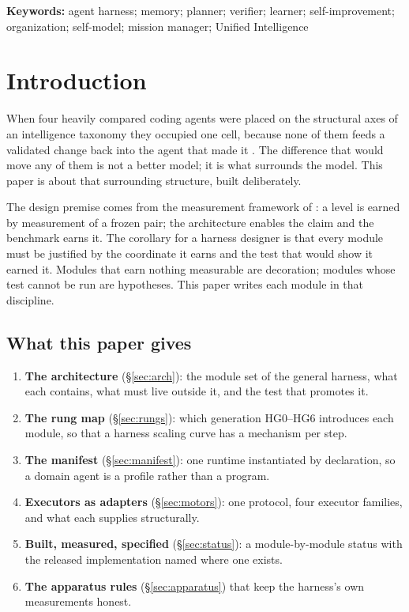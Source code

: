\documentclass[11pt]{article}
\theoremstyle{definition}
\begin{document}
\noindent\textbf{Keywords:} agent harness; memory; planner; verifier; learner; self-improvement; organization; self-model; mission manager; Unified Intelligence

\tableofcontents
\bigskip

\section{Introduction}\label{sec:intro}

When four heavily compared coding agents were placed on the structural axes of an intelligence taxonomy they occupied one cell, because none of them feeds a validated change back into the agent that made it \citep{yang2026capability}. The difference that would move any of them is not a better model; it is what surrounds the model. This paper is about that surrounding structure, built deliberately.

The design premise comes from the measurement framework of \citet{yang2026unified}: a level is earned by measurement of a frozen pair; the architecture enables the claim and the benchmark earns it. The corollary for a harness designer is that every module must be justified by the coordinate it earns and the test that would show it earned it. Modules that earn nothing measurable are decoration; modules whose test cannot be run are hypotheses. This paper writes each module in that discipline.

\subsection{What this paper gives}

\begin{enumerate}[leftmargin=*]
\item \textbf{The architecture} (\S\ref{sec:arch}): the module set of the general harness, what each contains, what must live outside it, and the test that promotes it.
\item \textbf{The rung map} (\S\ref{sec:rungs}): which generation HG0--HG6 introduces each module, so that a harness scaling curve has a mechanism per step.
\item \textbf{The manifest} (\S\ref{sec:manifest}): one runtime instantiated by declaration, so a domain agent is a profile rather than a program.
\item \textbf{Executors as adapters} (\S\ref{sec:motors}): one protocol, four executor families, and what each supplies structurally.
\item \textbf{Built, measured, specified} (\S\ref{sec:status}): a module-by-module status with the released implementation named where one exists.
\item \textbf{The apparatus rules} (\S\ref{sec:apparatus}) that keep the harness's own measurements honest.
\end{enumerate}
\end{document}
